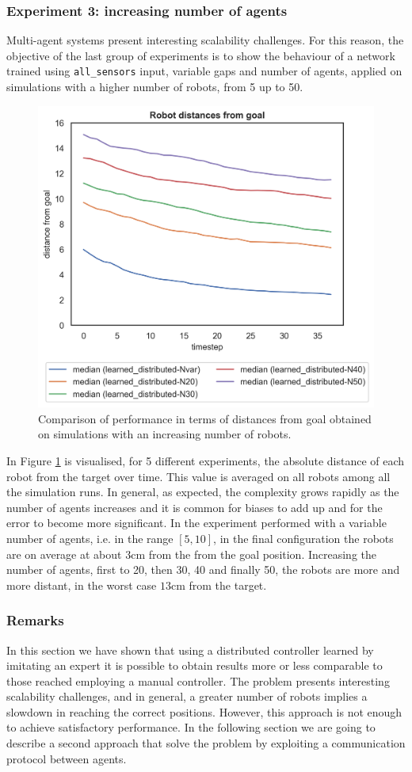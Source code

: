 \subsubsection{Experiment 3: increasing number of agents}
\label{subsubsec:task1-exp-distr-3}
Multi-agent systems present interesting scalability challenges. For this reason, the 
objective of the last group of experiments is to show the behaviour of a network 
trained using \texttt{all\_sensors} input, variable gaps and number of agents, 
applied on simulations with a higher number of robots, from 5 up to 50.
\begin{figure}[!htb]
	\centering
	\includegraphics[width=.5\textwidth]{contents/images/distances-from-goal-compressed-distributed}%
	\caption[Evaluation of distances from goal for a high number of 
	robots.]{Comparison of performance in terms of distances from goal obtained 
	on simulations with an increasing number of robots.}
	\label{fig:distdistr}
\end{figure}
In Figure \ref{fig:distdistr} is visualised, for 5 different experiments, the absolute 
distance of each robot from the target over time. This value is averaged on all 
robots among all the simulation runs. 
In general, as expected, the complexity grows rapidly as the number of agents 
increases and it is common for biases to add up and for the error to become more 
significant.
In the experiment performed with a variable number of agents, i.e. in the range 
$[5, 10]$, in the final configuration the robots are on average at about $3$cm 
from the from the goal position. Increasing the number of agents, first to 20, then 
30, 40 and finally 50, the robots are more and more distant, in the worst case 
$13$cm from the target.


\subsubsection{Remarks}
\label{subsubsec:remarks-task1-dist}
In this section we have shown that using a distributed controller learned by 
imitating an expert it is possible to obtain results more or less comparable to 
those reached employing a manual controller.
The problem presents interesting scalability challenges, and in general, a greater 
number of robots implies a slowdown in reaching the correct positions.
However, this approach is not enough to achieve satisfactory performance. In the 
following section we are going to describe a second approach that solve the 
problem by exploiting a communication protocol between agents.